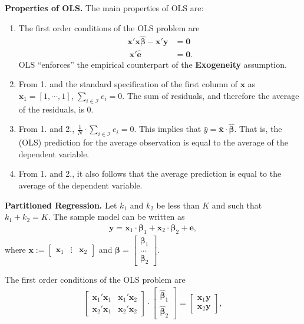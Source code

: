 \noindent \textbf{Properties of OLS.} The main properties of OLS are:
\begin{enumerate}
	\item The first order conditions of the OLS problem are
		\begin{align}
			\bm{x}' \bm{x} \hat{\bm{\beta}} - \bm{x}' \bm{y} & = \bm{0} \nonumber \\\
			\bm{x}' \hat{\bm{e}} & = \bm{0}.
		\end{align}
\noindent OLS ``enforces'' the empirical counterpart of the \textbf{Exogeneity} assumption. 
	\item From 1. and the standard specification of the first column of $\bm{x}$ as $\bm{x}_1 = \left[ 1, \cdots, 1 \right]$, $\sum \limits _{i \in \mathcal{I}} e_{i} = 0$. The sum of residuals, and therefore the average of the residuals, is $0$. 
	\item From 1. and 2., $\frac{1}{N} \cdot \sum \limits _{i \in \mathcal{I}} e_{i} = 0$. This implies that $\bar{y} = \bar{\bm{x}} \cdot \bm{\hat{\beta}}$. That is, the (OLS) prediction for the average observation is equal to the average of the dependent variable.
	\item From 1. and 2., it also follows that the average prediction is equal to the average of the dependent variable. 
\end{enumerate}

\noindent \textbf{Partitioned Regression.} Let $k_1$ and $k_2$ be less than $K$ and such that $k_1 + k_2 = K$. The sample model can be written as
\begin{align}
	\bm{y} = \bm{x}_1 \cdot \bm{\beta}_1 + \bm{x}_2 \cdot \bm{\beta}_2 + \bm{e}, 
\end{align}
\noindent where $\bm{x}:= \begin{bmatrix} \bm{x}_1 & \vdots & \bm{x}_2 \end{bmatrix}$ and $\bm{\beta} = \begin{bmatrix} \bm{\beta}_1 \\ \ldots \\ \bm{\beta}_2 \end{bmatrix}$. 

\noindent The first order conditions of the OLS problem are 
\begin{align}
	\begin{bmatrix}
		\bm{x}_1' \bm{x}_1 & \bm{x}_1' \bm{x}_2 \\
		\bm{x}_2' \bm{x}_1 & \bm{x}_2' \bm{x}_2 
	\end{bmatrix} \cdot
	\begin{bmatrix}
		\bm{\hat{\beta}}_1 \\
		\bm{\hat{\beta}}_2	
	\end{bmatrix} = 
	\begin{bmatrix}
		\bm{x}_1 \bm{y} \\ 
		\bm{x}_2 \bm{y}
	\end{bmatrix}, 
\end{align}

